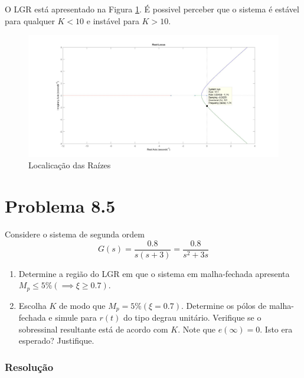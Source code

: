 \documentclass[
]{book}
\providecommand{\tightlist}{%
  \setlength{\itemsep}{0pt}\setlength{\parskip}{0pt}}
\theoremstyle{definition}
\theoremstyle{definition}
\theoremstyle{definition}
\theoremstyle{remark}
\begin{document}
O LGR está apresentado na Figura \ref{fig:fig8R61}. É possivel perceber que o sistema é estável para qualquer \(K < 10\) e instável para \(K > 10\).

\begin{figure}

{\centering \includegraphics{Imagens/Lab8/Resolução/fig61} 

}

\caption{Localicação das Raízes}\label{fig:fig8R61}
\end{figure}

\hypertarget{problema-8.5}{%
\section*{Problema 8.5}\label{problema-8.5}}

Considere o sistema de segunda ordem
\[
G(s) = \frac{0.8}{s(s+3)} = \frac{0.8}{s^2 + 3s}
\]

\begin{enumerate}
\def\labelenumi{\alph{enumi}.}
\tightlist
\item
  Determine a região do LGR em que o sistema em malha-fechada apresenta \(M_p \leq 5\% (\implies \xi \geq 0.7)\).
\item
  Escolha \(K\) de modo que \(M_p = 5\% (\xi = 0.7)\). Determine os pólos de malha-fechada e simule para \(r(t)\) do tipo degrau unitário. Verifique se o sobressinal resultante está de acordo com \(K\). Note que \(e(\infty)=0\). Isto era esperado? Justifique.
\end{enumerate}

\hypertarget{resoluuxe7uxe3o-26}{%
\subsubsection*{Resolução}\label{resoluuxe7uxe3o-26}}
\end{document}
